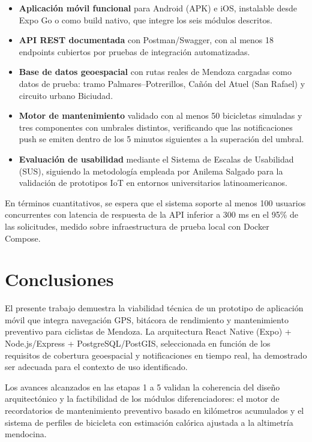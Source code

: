 \documentclass{llncs}
\begin{document}
\begin{itemize}
  \item \textbf{Aplicación móvil funcional} para Android (APK) e iOS, instalable desde Expo Go o como build nativo, que integre los seis módulos descritos.
  \item \textbf{API REST documentada} con Postman/Swagger, con al menos 18 endpoints cubiertos por pruebas de integración automatizadas.
  \item \textbf{Base de datos geoespacial} con rutas reales de Mendoza cargadas como datos de prueba: tramo Palmares–Potrerillos, Cañón del Atuel (San Rafael) y circuito urbano Biciudad.
  \item \textbf{Motor de mantenimiento} validado con al menos 50 bicicletas simuladas y tres componentes con umbrales distintos, verificando que las notificaciones push se emiten dentro de los 5 minutos siguientes a la superación del umbral.
  \item \textbf{Evaluación de usabilidad} mediante el Sistema de Escalas de Usabilidad (SUS), siguiendo la metodología empleada por Anilema Salgado \cite{Anilema2024} para la validación de prototipos IoT en entornos universitarios latinoamericanos.
\end{itemize}

En términos cuantitativos, se espera que el sistema soporte al menos 100 usuarios concurrentes con latencia de respuesta de la API inferior a 300 ms en el 95\% de las solicitudes, medido sobre infraestructura de prueba local con Docker Compose.

\section{Conclusiones}

El presente trabajo demuestra la viabilidad técnica de un prototipo de aplicación móvil que integra navegación GPS, bitácora de rendimiento y mantenimiento preventivo para ciclistas de Mendoza. La arquitectura React Native (Expo) + Node.js/Express + PostgreSQL/PostGIS, seleccionada en función de los requisitos de cobertura geoespacial y notificaciones en tiempo real, ha demostrado ser adecuada para el contexto de uso identificado.

Los avances alcanzados en las etapas 1 a 5 validan la coherencia del diseño arquitectónico y la factibilidad de los módulos diferenciadores: el motor de recordatorios de mantenimiento preventivo basado en kilómetros acumulados y el sistema de perfiles de bicicleta con estimación calórica ajustada a la altimetría mendocina.
\end{document}
